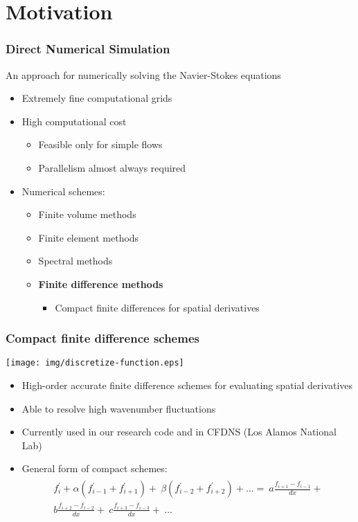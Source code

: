 
\section{Motivation}

\begin{frame}
\frametitle{Direct Numerical Simulation}

An approach for numerically solving
the Navier-Stokes equations

\begin{itemize}
\item Extremely fine computational grids
\item High computational cost
    \begin{itemize}
    \item Feasible only for simple flows
    \item Parallelism almost always required
    \end{itemize}
\item Numerical schemes:
    \begin{itemize}
    \item Finite volume methods
    \item Finite element methods
    \item Spectral methods
    \item \textbf{Finite difference methods}
        \begin{itemize}
            \item Compact finite differences for spatial derivatives
        \end{itemize}
    \end{itemize}
\end{itemize}
\end{frame}

\begin{frame}
\frametitle{Compact finite difference schemes}
\centering
\texttt{[image: img/discretize-function.eps]}
\begin{itemize}
\item High-order accurate finite difference schemes
for evaluating spatial derivatives
\item Able to resolve high wavenumber fluctuations
\item Currently used in our research code
    and in CFDNS (Los Alamos National Lab)
\item {General form of compact schemes:
\begin{align*}
\begin{split}
f_i^{\prime} + \alpha(f^{\prime}_{i-1} + f^{\prime}_{i+1}) + \
\beta(f^{\prime}_{i-2} + f^{\prime}_{i+2}) + \hdots  = \
a\frac{f_{i+1} - f_{i-1}}{dx} + \\
b\frac{f_{i+2} - f_{i-2}}{dx} + \
c\frac{f_{i+3} - f_{i-3}}{dx} + \
    \hdots
\end{split}
\end{align*}}
\end{itemize}
\end{frame}

